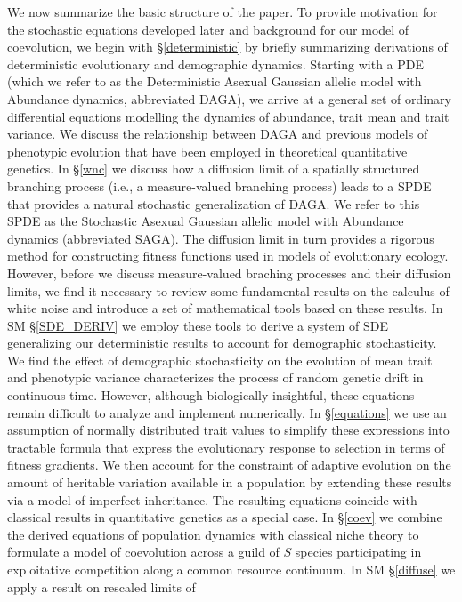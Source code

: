 \documentclass[]{article}
\begin{document}
We now summarize the basic structure of the paper. To provide motivation
for the stochastic equations developed later and background for our
model of coevolution, we begin with \S\ref{deterministic} by briefly
summarizing derivations of deterministic evolutionary and demographic
dynamics. Starting with a PDE (which we refer to as the Deterministic
Asexual Gaussian allelic model with Abundance dynamics, abbreviated
DAGA), we arrive at a general set of ordinary differential equations
modelling the dynamics of abundance, trait mean and trait variance. We
discuss the relationship between DAGA and previous models of phenotypic
evolution that have been employed in theoretical quantitative genetics.
In \S\ref{wnc} we discuss how a diffusion limit of a spatially
structured branching process (i.e., a measure-valued branching process)
leads to a SPDE that provides a natural stochastic generalization of
DAGA. We refer to this SPDE as the Stochastic Asexual Gaussian allelic
model with Abundance dynamics (abbreviated SAGA). The diffusion limit in
turn provides a rigorous method for constructing fitness functions used
in models of evolutionary ecology. However, before we discuss
measure-valued braching processes and their diffusion limits, we find it
necessary to review some fundamental results on the calculus of white
noise and introduce a set of mathematical tools based on these results.
In SM \S\ref{SDE_DERIV} we employ these tools to derive a system of SDE
generalizing our deterministic results to account for demographic
stochasticity. We find the effect of demographic stochasticity on the
evolution of mean trait and phenotypic variance characterizes the
process of random genetic drift in continuous time. However, although
biologically insightful, these equations remain difficult to analyze and
implement numerically. In \S\ref{equations} we use an assumption of
normally distributed trait values to simplify these expressions into
tractable formula that express the evolutionary response to selection in
terms of fitness gradients. We then account for the constraint of
adaptive evolution on the amount of heritable variation available in a
population by extending these results via a model of imperfect
inheritance. The resulting equations coincide with classical results in
quantitative genetics as a special case. In \S\ref{coev} we combine the
derived equations of population dynamics with classical niche theory to
formulate a model of coevolution across a guild of \(S\) species
participating in exploitative competition along a common resource
continuum. In SM \S\ref{diffuse} we apply a result on rescaled limits of
\end{document}
